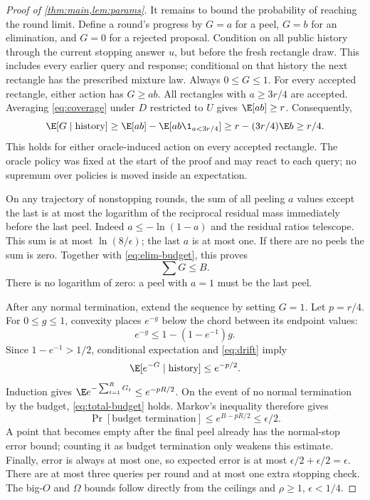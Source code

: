 \begin{proof}[Proof of \cref{thm:main,lem:params}]
It remains to bound the probability of reaching the round limit. Define a round's progress by $G=a$ for a peel, $G=b$ for an elimination, and $G=0$ for a rejected proposal. Condition on all public history through the current stopping answer $\widehat u$, but before the fresh rectangle draw. This includes every earlier query and response; conditional on that history the next rectangle has the prescribed mixture law. Always $0\le G\le1$. For every accepted rectangle, either action has $G\ge ab$. All rectangles with $a\ge3r/4$ are accepted. Averaging \eqref{eq:coverage} under $D$ restricted to $U$ gives $\E[ab]\ge r$. Consequently,
\begin{equation}\label{eq:drift}
 \E[G\mid\text{history}]
 \ge \E[ab]-\E[ab\1_{a<3r/4}]
 \ge r-(3r/4)\E b\ge r/4.
\end{equation}
This holds for either oracle-induced action on every accepted rectangle. The oracle policy was fixed at the start of the proof and may react to each query; no supremum over policies is moved inside an expectation.

On any trajectory of nonstopping rounds, the sum of all peeling $a$ values except the last is at most the logarithm of the reciprocal residual mass immediately before the last peel. Indeed $a\le-\ln(1-a)$ and the residual ratios telescope. This sum is at most $\ln(8/\epsilon)$; the last $a$ is at most one. If there are no peels the sum is zero. Together with \eqref{eq:elim-budget}, this proves
\begin{equation}\label{eq:total-budget}
 \sum G\le B.
\end{equation}
There is no logarithm of zero: a peel with $a=1$ must be the last peel.

After any normal termination, extend the sequence by setting $G=1$. Let $p=r/4$. For $0\le g\le1$, convexity places $e^{-g}$ below the chord between its endpoint values:
\[
 e^{-g}\le1-(1-e^{-1})g.
\]
Since $1-e^{-1}>1/2$, conditional expectation and \eqref{eq:drift} imply
\[
 \E[e^{-G}\mid\text{history}]\le e^{-p/2}.
\]
Induction gives $\E e^{-\sum_{t=1}^RG_t}\le e^{-pR/2}$. On the event of no normal termination by the budget, \eqref{eq:total-budget} holds. Markov's inequality therefore gives
\[
 \Pr[\text{budget termination}]
 \le e^{B-pR/2}\le\epsilon/2.
\]
A point that becomes empty after the final peel already has the normal-stop error bound; counting it as budget termination only weakens this estimate. Finally, error is always at most one, so expected error is at most $\epsilon/2+\epsilon/2=\epsilon$. There are at most three queries per round and at most one extra stopping check. The big-$O$ and $\Omega$ bounds follow directly from the ceilings and $\rho\ge1$, $\epsilon<1/4$.
\end{proof}
